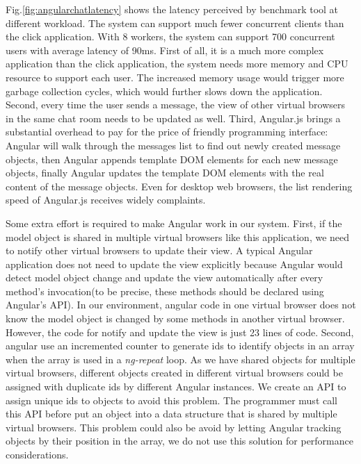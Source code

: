 Fig.\ref{fig:angularchatlatency} shows the latency perceived by benchmark tool
at different workload.
The system can support much fewer concurrent clients than the click application.
With 8 workers, the system can support 700 concurrent users with average latency 
of 90ms.
First of all, it is a much more complex application than the click application,
the system needs more memory and CPU resource to support each user.
The increased memory usage would trigger more garbage collection cycles,
which would further slows down the application.
Second, every time the user sends a message, the view of other virtual browsers
in the same chat room needs to be updated as well.
Third, Angular.js brings a substantial overhead 
to pay for the price of friendly programming interface: %
Angular will walk through the messages list to find out newly created
message objects,
then Angular appends template DOM elements for each new message objects,
finally Angular updates the template DOM elements with the real content of the 
message objects.
Even for desktop web browsers, the list rendering speed of Angular.js
receives widely complaints.%

Some extra effort is required to make Angular work in our system.
First, if the model object is shared in multiple virtual browsers like this application,
we need to notify other virtual browsers to update their view.
A typical Angular application does not need to update the view explicitly because
Angular would detect model object change and update the view automatically 
after every method's invocation(to be precise, these methods should be declared using Angular's API).
In our environment, angular code in one virtual browser does not know the model object
is changed by some methods in another virtual browser.
However, the code for notify and update the view is just 23 lines of code.
Second, angular use an incremented counter to generate ids to identify objects in an array when the 
array is used in a \emph{ng-repeat} loop.
As we have shared objects for multiple virtual browsers,
different objects created in different virtual browsers could be assigned with duplicate 
ids by different Angular instances.
We create an API to assign unique ids to objects to avoid this problem.
The programmer must call this API before put an object into a data structure that is shared
by multiple virtual browsers.
This problem could also be avoid by letting Angular tracking objects by their position in the array,
we do not use this solution for performance considerations.


